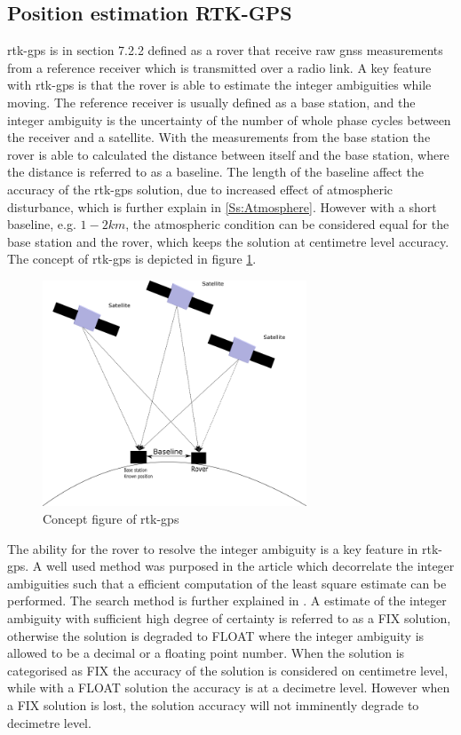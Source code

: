 \subsection{Position estimation RTK-GPS}\label{ss:rtk-gps}
\acrfull{rtk-gps} is in \citep{misra2011global} section 7.2.2 defined as a rover that receive raw \gls{gnss} measurements from a reference receiver which is transmitted over a radio link. A key feature with \gls{rtk-gps} is that the rover is able to estimate the integer ambiguities while moving. The reference receiver is usually defined as a base station, and the integer ambiguity is the uncertainty of the number of whole phase cycles between the receiver and a satellite. With the measurements from the base station the rover is able to calculated the distance between itself and the base station, where the distance is referred to as a baseline. The length of the baseline affect the accuracy of the \gls{rtk-gps} solution, due to increased effect of atmospheric disturbance, which is further explain in \ref{Ss:Atmosphere}. However with a short baseline, e.g. $1-2 km$, the atmospheric condition can be considered equal for the base station and the rover, which keeps the solution  at centimetre level accuracy. The concept of \gls{rtk-gps} is depicted in figure \ref{figure:RTK}.
\begin{figure}[H]
	\centering
		\includegraphics[width=0.7\textwidth]{figs/DGPS.png}
		\caption{Concept figure of \acrfull{rtk-gps}}
		\label{figure:RTK}
\end{figure}
The ability for the rover to resolve the integer ambiguity is a key feature in \gls{rtk-gps}. A well used method was purposed in the article \citep{teunissen1994new} which decorrelate the integer ambiguities such that a efficient computation of the least square estimate can be performed. The search method is further explained in \citep{teunissen1995least}. A estimate of the integer ambiguity with sufficient high degree of certainty is referred to as a FIX solution, otherwise the solution is degraded to FLOAT where the integer ambiguity is allowed to be a decimal or a floating point number. When the solution is categorised as FIX the accuracy of the solution is considered on centimetre level, while with a FLOAT solution the accuracy is at a decimetre level. However when a FIX solution is lost, the solution accuracy will not imminently degrade to decimetre level.

